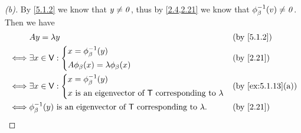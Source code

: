 \begin{proof}[(b)]
  By \cref{5.1.2} we know that \(y \neq \mathit{0}\), thus by \cref{2.4,2.21} we know that \(\phi_{\beta}^{-1}(v) \neq \mathit{0}\).
  Then we have
  \begin{align*}
         & A y = \lambda y                                                                          &  & \text{(by \cref{5.1.2})} \\
    \iff & \exists x \in \V : \begin{dcases}
                                x = \phi_{\beta}^{-1}(y) \\
                                A \phi_{\beta}(x) = \lambda \phi_{\beta}(x)
                              \end{dcases}                                              &  & \text{(by \cref{2.21})}              \\
    \iff & \exists x \in \V : \begin{dcases}
                                x = \phi_{\beta}^{-1}(y) \\
                                x \text{ is an eigenvector of } \T \text{ corresponding to } \lambda
                              \end{dcases}                     &  & \text{(by \cref{ex:5.1.13}(a))}                               \\
    \iff & \phi_{\beta}^{-1}(y) \text{ is an eigenvector of } \T \text{ corresponding to } \lambda. &  & \text{(by \cref{2.21})}
  \end{align*}
\end{proof}
